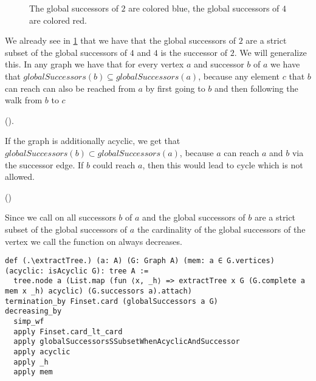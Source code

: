 \begin{figure}
    \centering
      \caption{The global successors of $2$ are colored blue, the global successors of $4$ are colored red.}
      \label{fig:globalSuccessors}
\end{figure}

We already see in \cref{fig:globalSuccessors} that we have that the global successors of $2$ are a strict subset of the global successors of $4$ and $4$ is the successor of $2$. We will generalize this. In any graph we have that for every vertex $a$ and successor $b$ of $a$ we have that $globalSuccessors(b) \subseteq globalSuccessors(a)$, because any element $c$ that $b$ can reach can also be reached from $a$ by first going to $b$ and then following the walk from $b$ to $c$

(\globalSuccessorsSubsetWhenSuccessor).


If the graph is additionally acyclic, we get that $globalSuccessors(b) \subset globalSuccessors(a)$, because $a$ can reach $a$ and $b$ via the successor edge. If $b$ could reach $a$, then this would lead to cycle which is not allowed.

(\globalSuccessorsSSubsetWhenAcyclicAndSuccessor)

Since we call \extractTree on all successors $b$ of $a$ and the global successors of $b$ are a strict subset of the global successors of $a$ the cardinality of the global successors of the vertex we call the function on always decreases.

\begin{lstlisting}
def (.\extractTree.) (a: A) (G: Graph A) (mem: a ∈ G.vertices) (acyclic: isAcyclic G): tree A :=
  tree.node a (List.map (fun ⟨x, _h⟩ => extractTree x G (G.complete a mem x _h) acyclic) (G.successors a).attach)
termination_by Finset.card (globalSuccessors a G)
decreasing_by
  simp_wf
  apply Finset.card_lt_card
  apply globalSuccessorsSSubsetWhenAcyclicAndSuccessor
  apply acyclic
  apply _h
  apply mem
\end{lstlisting}

